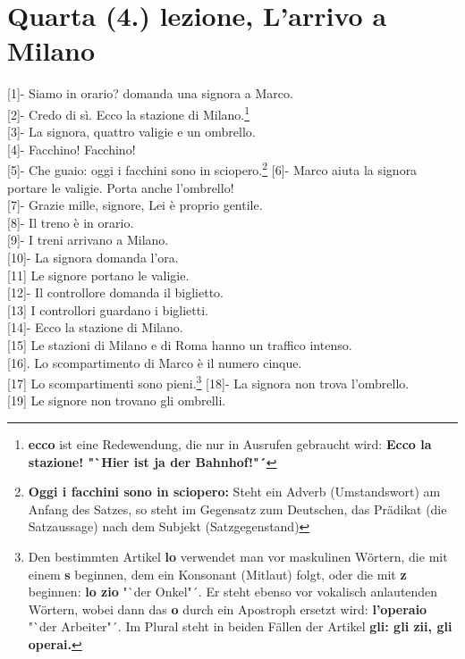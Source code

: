 \documentclass{article}
\begin{document}
\section{Quarta (4.) lezione, L'arrivo a Milano}

{[1]}- Siamo in orario? domanda una signora a Marco.\\
{[2]}- Credo di sì. Ecco la stazione di Milano.\footnote{\textbf{ecco} ist
eine Redewendung, die nur in Ausrufen gebraucht wird: \textbf{Ecco la stazione!
"`Hier ist ja der Bahnhof!"´}}\\
{[3]}- La signora, quattro valigie e un ombrello.\\
{[4]}- Facchino! Facchino!\\
{[5]}- Che guaio: oggi i facchini sono in sciopero.\footnote{\textbf{Oggi i
facchini sono in sciopero:} Steht ein Adverb (Umstandswort)
am Anfang des Satzes, so steht im Gegensatz zum Deutschen,
das Prädikat (die Satzaussage) nach dem Subjekt (Satzgegenstand) }
{[6]}- Marco aiuta la signora portare le valigie. Porta anche l'ombrello!\\
{[7]}- Grazie mille, signore, Lei è proprio gentile.\\
{[8]}- Il treno è in orario.\\
{[9]}- I treni arrivano a Milano.\\
{[10]}- La signora domanda l'ora.\\
{[11]} Le signore portano le valigie.\\
{[12]}- Il controllore domanda il biglietto.\\
{[13]} I controllori guardano i biglietti.\\
{[14]}- Ecco la stazione di Milano.\\
{[15]} Le stazioni di Milano e di Roma hanno un traffico intenso.\\
{[16]}. Lo scompartimento di Marco è il numero cinque.\\
{[17]} Lo scompartimenti sono pieni.\footnote{Den bestimmten Artikel
    \textbf{lo} verwendet man vor maskulinen Wörtern, die mit einem \textbf{s}
    beginnen, dem ein Konsonant (Mitlaut) folgt, oder die mit \textbf{z}
    beginnen: \textbf{lo zio} "`der Onkel"´. Er steht ebenso vor vokalisch
    anlautenden Wörtern, wobei dann das \textbf{o} durch ein Apostroph ersetzt
    wird: \textbf{l'operaio} "`der Arbeiter"´. Im Plural steht in beiden Fällen
    der Artikel \textbf{gli: gli zii, gli operai.}}
{[18]}- La signora non trova l'ombrello.\\
{[19]} Le signore non trovano gli ombrelli.\\
\end{document}
